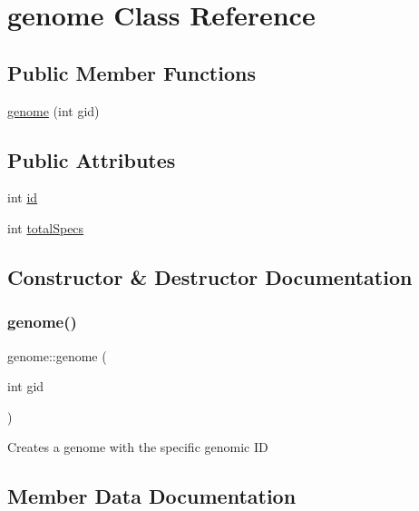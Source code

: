 \hypertarget{classgenome}{}\section{genome Class Reference}
\label{classgenome}
\subsection*{Public Member Functions}
\begin{DoxyCompactItemize}
\item 
\hyperlink{classgenome_af43b7aebd7d55e9738e005ca550b1e14}{genome} (int gid)
\end{DoxyCompactItemize}
\subsection*{Public Attributes}
\begin{DoxyCompactItemize}
\item 
int \hyperlink{classgenome_a6406886ece73577a579a8dafd5e9383a}{id}
\item 
int \hyperlink{classgenome_a34773e095a642f78ffc33c1ed649c9a7}{total\+Specs}
\end{DoxyCompactItemize}


\subsection{Constructor \& Destructor Documentation}
\hypertarget{classgenome_af43b7aebd7d55e9738e005ca550b1e14}{}\label{classgenome_af43b7aebd7d55e9738e005ca550b1e14} 
\subsubsection{\texorpdfstring{genome()}{genome()}}
{\footnotesize\ttfamily genome\+::genome (\begin{DoxyParamCaption}\item[{int}]{gid }\end{DoxyParamCaption})}

Creates a genome with the specific genomic ID 

\subsection{Member Data Documentation}
\hypertarget{classgenome_a6406886ece73577a579a8dafd5e9383a}{}\label{classgenome_a6406886ece73577a579a8dafd5e9383a} 
